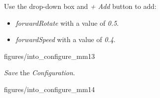 \documentclass[11pt,a4paper]{../tutorial}
\begin{document}
\begin{instructions}
\item Use the drop-down box and \emph{+ Add} button to add:
    \begin{itemize}
      \item \emph{forwardRotate} with a value of \emph{0.5}.
      \item \emph{forwardSpeed} with a value of \emph{0.4}.
    \end{itemize}

    \begin{annotation}[width=0.8\linewidth,trim=0 0 0 0,clip]{figures/into_configure_mm13}
    \end{annotation}

\newpage
\item \emph{Save} the \emph{Configuration}.

    \begin{annotation}[width=0.8\linewidth,trim=0 0 0 250,clip]{figures/into_configure_mm14}
    \end{annotation}

%
%

%


\end{instructions}
\end{document}
